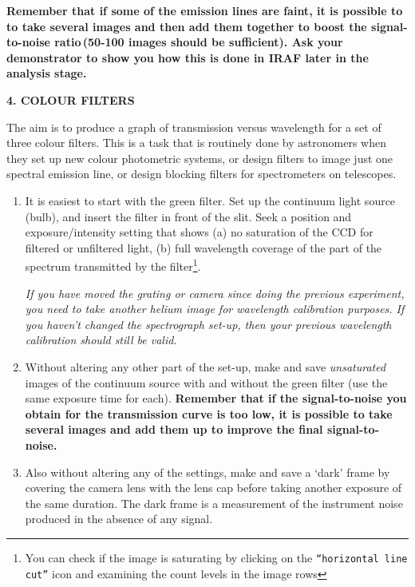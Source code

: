 \documentclass[12pt]{article}
\begin{document}
{\bf Remember that if some of the emission lines are faint, it is possible to to take several images and then add them together to boost the signal-to-noise ratio\,(50-100 images should be sufficient). Ask your demonstrator to show you how this is done in IRAF later in the analysis stage.}


{\bf 4. COLOUR FILTERS}

The aim is to produce a graph of transmission versus wavelength for a set of three colour filters. This is a task that is routinely done by astronomers when they set up new colour photometric systems, or design filters to image just one spectral emission line, or design blocking filters for spectrometers on telescopes.

\begin{enumerate}

\item It is easiest to start with the green filter. Set up the continuum light source (bulb), and insert the filter in front of the slit. Seek a position and exposure/intensity setting that shows (a) no saturation of the CCD for filtered or unfiltered light, (b) full wavelength coverage of the part of the spectrum transmitted by the filter\footnote{You can check if the image is saturating by clicking on the {\tt ``horizontal line cut''} icon and examining the count levels in the image rows}.

{\it If you have moved the grating or camera since doing the previous experiment, you need to take another helium image for wavelength calibration purposes. If you haven't changed the spectrograph set-up, then your previous wavelength calibration should still be valid.}

\item Without altering any other part of the set-up, make and save {\sl unsaturated} images of the continuum source with and without the green filter (use the same exposure time for each). {\bf Remember that if the signal-to-noise you obtain for the transmission curve is too low, it is possible to take several images and add them up to improve the final signal-to-noise.}

\item Also without altering any of the settings, make and save a `dark' frame by covering the camera lens with the lens cap before taking another exposure of the same duration. The dark frame is a measurement of the instrument noise produced in the absence of any signal.

\end{enumerate}
\end{document}

